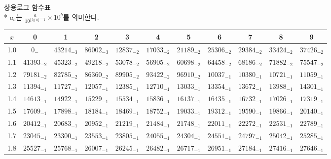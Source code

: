 \documentclass[10pt, a4paper]{article}
\begin{document}
\pagebreak
\begin{center}
    \huge{상용로그 함수표}\normalsize\\

    * \(a_b\)는 \(\displaystyle{\frac{a}{\displaystyle{10^{\lfloor \lg{a} \rfloor - 1}}} \times 10^{b}}\)를 의미한다. 
    \begin{longtable}{c || c c c c c | c c c c c}
        \(x\) & 0 & 1 & 2 & 3 & 4 & 5 & 6 & 7 & 8 & 9\\
        \hline\hline
        1.0 & \({0}_{-}\) & \({43214}_{-3}\) & \({86002}_{-3}\) & \({12837}_{-2}\) & \({17033}_{-2}\) & \({21189}_{-2}\) & \({25306}_{-2}\) & \({29384}_{-2}\) & \({33424}_{-2}\) & \({37426}_{-2}\)\\
        1.1 & \({41393}_{-2}\) & \({45323}_{-2}\) & \({49218}_{-2}\) & \({53078}_{-2}\) & \({56905}_{-2}\) & \({60698}_{-2}\) & \({64458}_{-2}\) & \({68186}_{-2}\) & \({71882}_{-2}\) & \({75547}_{-2}\)\\
        1.2 & \({79181}_{-2}\) & \({82785}_{-2}\) & \({86360}_{-2}\) & \({89905}_{-2}\) & \({93422}_{-2}\) & \({96910}_{-2}\) & \({10037}_{-1}\) & \({10380}_{-1}\) & \({10721}_{-1}\) & \({11059}_{-1}\)\\
        1.3 & \({11394}_{-1}\) & \({11727}_{-1}\) & \({12057}_{-1}\) & \({12385}_{-1}\) & \({12710}_{-1}\) & \({13033}_{-1}\) & \({13354}_{-1}\) & \({13672}_{-1}\) & \({13988}_{-1}\) & \({14301}_{-1}\)\\
        1.4 & \({14613}_{-1}\) & \({14922}_{-1}\) & \({15229}_{-1}\) & \({15534}_{-1}\) & \({15836}_{-1}\) & \({16137}_{-1}\) & \({16435}_{-1}\) & \({16732}_{-1}\) & \({17026}_{-1}\) & \({17319}_{-1}\)\\
        1.5 & \({17609}_{-1}\) & \({17898}_{-1}\) & \({18184}_{-1}\) & \({18469}_{-1}\) & \({18752}_{-1}\) & \({19033}_{-1}\) & \({19312}_{-1}\) & \({19590}_{-1}\) & \({19866}_{-1}\) & \({20140}_{-1}\)\\
        1.6 & \({20412}_{-1}\) & \({20683}_{-1}\) & \({20952}_{-1}\) & \({21219}_{-1}\) & \({21484}_{-1}\) & \({21748}_{-1}\) & \({22011}_{-1}\) & \({22272}_{-1}\) & \({22531}_{-1}\) & \({22789}_{-1}\)\\
        1.7 & \({23045}_{-1}\) & \({23300}_{-1}\) & \({23553}_{-1}\) & \({23805}_{-1}\) & \({24055}_{-1}\) & \({24304}_{-1}\) & \({24551}_{-1}\) & \({24797}_{-1}\) & \({25042}_{-1}\) & \({25285}_{-1}\)\\
        1.8 & \({25527}_{-1}\) & \({25768}_{-1}\) & \({26007}_{-1}\) & \({26245}_{-1}\) & \({26482}_{-1}\) & \({26717}_{-1}\) & \({26951}_{-1}\) & \({27184}_{-1}\) & \({27416}_{-1}\) & \({27646}_{-1}\)\\

\end{longtable}
\end{center}
\end{document}

